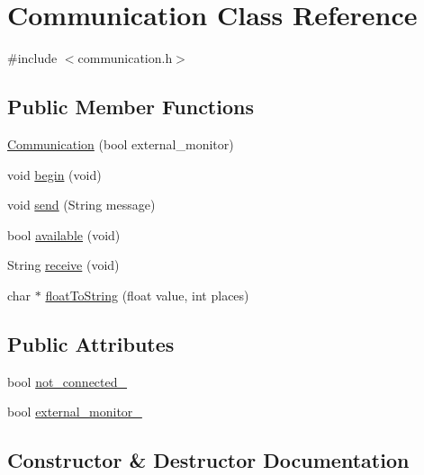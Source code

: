 \hypertarget{class_communication}{}\section{Communication Class Reference}
\label{class_communication}


{\ttfamily \#include $<$communication.\+h$>$}

\subsection*{Public Member Functions}
\begin{DoxyCompactItemize}
\item 
\hyperlink{class_communication_ae4ec63ef0cb6f372450f8add24e18850}{Communication} (bool external\+\_\+monitor)
\item 
void \hyperlink{class_communication_af7eea76d811d38b02fb67ec5133e6eec}{begin} (void)
\item 
void \hyperlink{class_communication_a7905fe8302c11cc1c1dc8a10bc71fdc6}{send} (String message)
\item 
bool \hyperlink{class_communication_a086f2246c7e3715c8de1bc96cfbce262}{available} (void)
\item 
String \hyperlink{class_communication_ad53d6b2efc619612fb542afdfda43ec0}{receive} (void)
\item 
char $\ast$ \hyperlink{class_communication_ab2e91cc9da163309c70a3c4ec38af590}{float\+To\+String} (float value, int places)
\end{DoxyCompactItemize}
\subsection*{Public Attributes}
\begin{DoxyCompactItemize}
\item 
bool \hyperlink{class_communication_a566d648baea3543f997db397e7467a75}{not\+\_\+connected\+\_\+}
\item 
bool \hyperlink{class_communication_ac60291942ae7aa630ca851975baa52b3}{external\+\_\+monitor\+\_\+}
\end{DoxyCompactItemize}


\subsection{Constructor \& Destructor Documentation}
\hypertarget{class_communication_ae4ec63ef0cb6f372450f8add24e18850}{}
